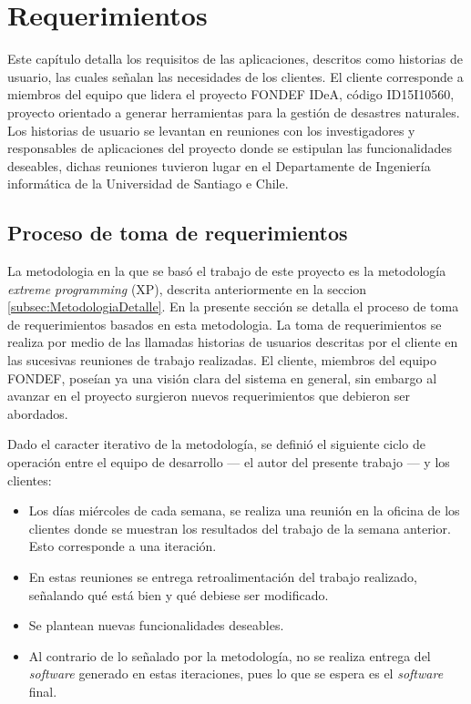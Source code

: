 \chapter{Requerimientos}
\label{cap:Requerimientos}

Este capítulo detalla los requisitos de las aplicaciones, descritos como historias de usuario, las cuales señalan las necesidades de los clientes. El cliente corresponde a miembros del equipo que lidera el proyecto FONDEF IDeA, código ID15I10560, proyecto orientado a generar herramientas para la gestión de desastres naturales. Los historias de usuario se levantan en reuniones con los investigadores y responsables de aplicaciones del proyecto donde se estipulan las funcionalidades deseables, dichas reuniones tuvieron lugar en el Departamente de Ingeniería informática de la Universidad de Santiago e Chile.

\section{Proceso de toma de requerimientos}
\label{sec:tomaDeRequerimientos}

La metodologia en la que se basó el trabajo de este proyecto es la metodología \textit{extreme programming} (XP), descrita anteriormente en la seccion \ref{subsec:MetodologiaDetalle}. En la presente sección se detalla el proceso de toma de requerimientos basados en esta metodologia. La toma de requerimientos se realiza por medio de las llamadas historias de usuarios descritas por el cliente en las sucesivas reuniones de trabajo realizadas.
El cliente, miembros del equipo FONDEF, poseían ya una visión clara del sistema en general, sin embargo al avanzar en el proyecto surgieron nuevos requerimientos que debieron ser abordados.

Dado el caracter iterativo de la metodología, se definió el siguiente ciclo de operación entre el equipo de desarrollo — el autor del presente trabajo — y los clientes:

\begin{itemize}
\item Los días miércoles de cada semana, se realiza una reunión en la oficina de los clientes donde se muestran los resultados del trabajo de la semana anterior. Esto corresponde a una iteración.
\item En estas reuniones se entrega retroalimentación del trabajo realizado, señalando qué está bien y qué debiese ser modificado.
\item Se plantean nuevas funcionalidades deseables.
\item Al contrario de lo señalado por la metodología, no se realiza entrega del \textit{software} generado en estas iteraciones, pues lo que se espera es el \textit{software} final.
\end{itemize}

